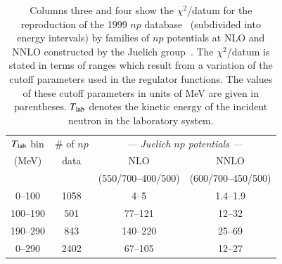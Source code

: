 \documentclass[sort&compress,preprint,3p]{elsarticle}
\begin{document}
\begin{table}[t]
\caption{Columns three and four show the
$\chi^2$/datum for the reproduction of the 1999 $np$ 
database~\cite{note2} (subdivided into energy intervals)
by families of $np$ potentials at NLO and NNLO constructed by the
Juelich group~\cite{EGM04}.
The $\chi^2$/datum is stated in terms of ranges
which result from a variation of the cutoff parameters
used in the regulator functions.
The values of these cutoff parameters in units of MeV are given in 
parentheses.
$T_{\rm lab}$ denotes the kinetic energy of the incident neutron
in the laboratory system.
\label{tab_chi2a}}
\smallskip
\begin{tabular*}{\textwidth}{@{\extracolsep{\fill}}cccc}
\hline 
\hline 
\noalign{\smallskip}
 $T_{\rm lab}$ bin &  \# of $np$ & 
\multicolumn{2}{c}{\it --- Juelich $np$ potentials --- }\\
 (MeV) 
 & data 
 & NLO
 & NNLO 
\\
 & & (550/700--400/500) & (600/700--450/500)
 \\
\hline 
\hline 
\noalign{\smallskip}
0--100&1058&4--5&1.4--1.9\\ 
100--190&501&77--121&12--32\\ 
190--290&843&140--220&25--69\\ 
\hline 
\noalign{\smallskip}
0--290&2402&67--105&12--27
\\ 
\hline 
\hline 
\end{tabular*}
\end{table}
\end{document}
